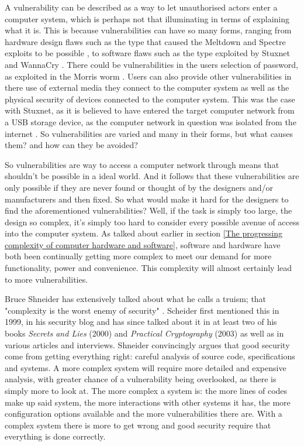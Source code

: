 A vulnerability can be described as a way to let unauthorised actors enter a computer system, which is perhaps not that illuminating in terms of explaining what it is. This is because vulnerabilities can have so many forms, ranging from hardware design flaws such as the type that caused the Meltdown and Spectre exploits to be possible \cite{RN16}, to software flaws such as the type exploited by Stuxnet and WannaCry \cite{RN91}\cite{RN94}. There could be vulnerabilities in the users selection of password, as exploited in the Morris worm \cite{RN86}. Users can also provide other vulnerabilities in there use of external media they connect to the computer system as well as the physical security of devices connected to the computer system. This was the case with Stuxnet, as it is believed to have entered the target computer network from a USB storage device, as the computer network in question was isolated from the internet \cite{RN91}. So vulnerabilities are varied and many in their forms, but what causes them? and how can they be avoided?

So vulnerabilities are way to access a computer network through means that shouldn't be possible in a ideal world. And it follows that these vulnerabilities are only possible if they are never found or thought of by the designers and/or manufacturers and then fixed. So what would make it hard for the designers to find the aforementioned vulnerabilities? Well, if the task is simply too large, the design so complex, it's simply too hard to consider every possible avenue of access into the computer system. As talked about earlier in section \ref{The progressing complexity of computer hardware and software}, software and hardware have both been continually getting more complex to meet our demand for more functionality, power and convenience. This complexity will almost certainly lead to more vulnerabilities.

Bruce Shneider has extensively talked about what he calls a truism; that "complexity is the worst enemy of security" \cite{RN96}. Scheider first mentioned this in 1999, in his security blog \cite{RN3} and has since talked about it in at least two of his books \textit{Secrets and Lies} (2000) and \textit{Practical Cryptography} (2003) as well as in various articles and interviews. Shneider convincingly argues that good security come from getting everything right: careful analysis of source code, specifications and systems. A more complex system will require more detailed and expensive analysis, with greater chance of a vulnerability being overlooked, as there is simply more to look at. The more complex a system is: the more lines of codes make up said system, the more interactions with other systems it has, the more configuration options available and the more vulnerabilities there are. With a complex system there is more to get wrong and good security require that everything is done correctly.

